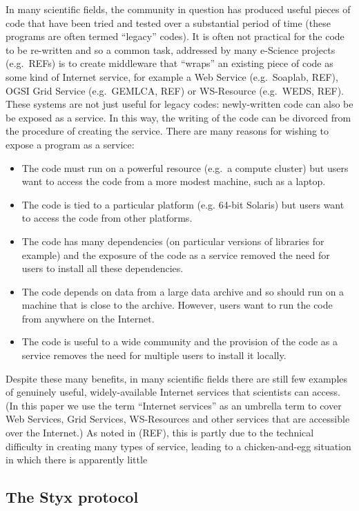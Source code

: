 \documentclass{llncs}
\begin{document}
In many scientific fields, the community in question has produced useful pieces of code that have been tried and tested over a substantial period of time (these programs are often termed ``legacy'' codes).  It is often not practical for the code to be re-written and so a common task, addressed by many e-Science projects (e.g.\ REFs) is to create middleware that ``wraps'' an existing piece of code as some kind of Internet service, for example a Web Service (e.g.\ Soaplab, REF), OGSI Grid Service (e.g.\ GEMLCA, REF) or WS-Resource (e.g.\ WEDS, REF).  These systems are not just useful for legacy codes: newly-written code can also be be exposed as a service.  In this way, the writing of the code can be divorced from the procedure of creating the service.  There are many reasons for wishing to expose a program as a service:
\begin{itemize}
	\item The code must run on a powerful resource (e.g.\ a compute cluster) but users want to access the code from a more modest machine, such as a laptop.
	\item The code is tied to a particular platform (e.g. 64-bit Solaris) but users want to access the code from other platforms.
	\item The code has many dependencies (on particular versions of libraries for example) and the exposure of the code as a service removed the need for users to install all these dependencies.
	\item The code depends on data from a large data archive and so should run on a machine that is close to the archive.  However, users want to run the code from anywhere on the Internet.
	\item The code is useful to a wide community and the provision of the code as a service removes the need for multiple users to install it locally.
\end{itemize}

Despite these many benefits, in many scientific fields there are still few examples of genuinely useful, widely-available Internet services that scientists can access.  (In this paper we use the term ``Internet services'' as an umbrella term to cover Web Services, Grid Services, WS-Resources and other services that are accessible over the Internet.)  As noted in (REF), this is partly due to the technical difficulty in creating many types of service, leading to a chicken-and-egg situation in which there is apparently little
%
\subsection{The Styx protocol}
%
\end{document}
